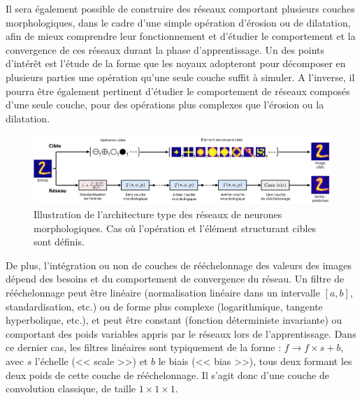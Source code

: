 \vspace{-1.6mm}
\noindent Il sera également possible de construire des réseaux comportant plusieurs couches morphologiques, dans le cadre d'une simple opération d'érosion ou de dilatation, afin de mieux comprendre leur fonctionnement et d'étudier le comportement et la convergence de ces réseaux durant la phase d'apprentissage. Un des points d'intérêt est l'étude de la forme que les noyaux adopteront pour décomposer en plusieurs parties une opération qu'une seule couche suffit à simuler. A l'inverse, il pourra être également pertinent d'étudier le comportement de réseaux composés d'une seule couche, pour des opérations plus complexes que l'érosion ou la dilatation.


\newpage

\begin{figure}[ht]
  \begin{center}
    \includegraphics[width=1.00\textwidth]{parts/2-etat_de_lart/B-structure_des_reseaux_morphologiques/figures/reseau_morpho.pdf}
    \vspace{-3.6mm}
    \caption{ \centering Illustration de l'architecture type des réseaux de neurones morphologiques. Cas où l'opération et l'élément structurant cibles sont définis.}
    \label{fig:architecture_reseau_morpho}
  \end{center}
\end{figure}

\vspace{-3.4mm}
De plus, l'intégration ou non de couches de rééchelonnage des valeurs des images dépend des besoins et du comportement de convergence du réseau. Un filtre de rééchelonnage peut être linéaire (normalisation linéaire dans un intervalle $[a,b]$, standardisation, etc.) ou de forme plus complexe (logarithmique, tangente hyperbolique, etc.), et peut être constant (fonction déterministe invariante) ou comportant des poids variables appris par le réseaux lors de l'apprentissage. Dans ce dernier cas, les filtres linéaires sont typiquement de la forme : $f \rightarrow f \times s + b$, avec $s$ l'échelle (<< scale >>) et $b$ le biais (<< bias >>), tous deux formant les deux poids de cette couche de rééchelonnage. Il s'agit donc d'une couche de convolution classique, de taille $1 \times 1 \times 1$. \\

